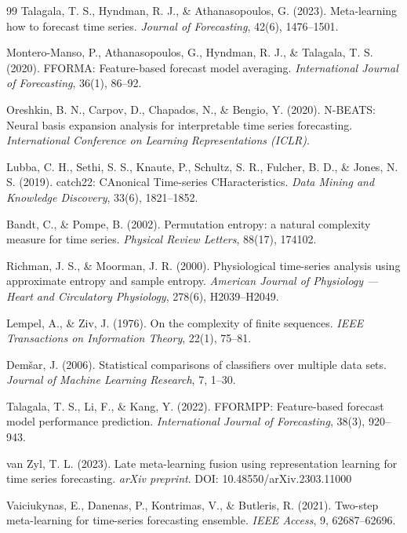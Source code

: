{\begin{thebibliography}{99}
Talagala, T. S., Hyndman, R. J., \& Athanasopoulos, G. (2023). Meta-learning how to
forecast time series. \emph{Journal of Forecasting}, 42(6), 1476--1501.

Montero-Manso, P., Athanasopoulos, G., Hyndman, R. J., \& Talagala, T. S. (2020).
FFORMA: Feature-based forecast model averaging.
\emph{International Journal of Forecasting}, 36(1), 86--92.

Oreshkin, B. N., Carpov, D., Chapados, N., \& Bengio, Y. (2020). N-BEATS: Neural basis
expansion analysis for interpretable time series forecasting.
\emph{International Conference on Learning Representations (ICLR)}.

Lubba, C. H., Sethi, S. S., Knaute, P., Schultz, S. R., Fulcher, B. D., \& Jones, N. S.
(2019). catch22: CAnonical Time-series CHaracteristics.
\emph{Data Mining and Knowledge Discovery}, 33(6), 1821--1852.

Bandt, C., \& Pompe, B. (2002). Permutation entropy: a natural complexity measure
for time series. \emph{Physical Review Letters}, 88(17), 174102.

Richman, J. S., \& Moorman, J. R. (2000). Physiological time-series analysis using
approximate entropy and sample entropy.
\emph{American Journal of Physiology --- Heart and Circulatory Physiology},
278(6), H2039--H2049.

Lempel, A., \& Ziv, J. (1976). On the complexity of finite sequences.
\emph{IEEE Transactions on Information Theory}, 22(1), 75--81.

Dem\v{s}ar, J. (2006). Statistical comparisons of classifiers over multiple data
sets. \emph{Journal of Machine Learning Research}, 7, 1--30.

Talagala, T. S., Li, F., \& Kang, Y. (2022). FFORMPP: Feature-based forecast model
performance prediction.
\emph{International Journal of Forecasting}, 38(3), 920--943.

van Zyl, T. L. (2023). Late meta-learning fusion using representation learning for
time series forecasting. \emph{arXiv preprint}. DOI: 10.48550/arXiv.2303.11000

Vaiciukynas, E., Danenas, P., Kontrimas, V., \& Butleris, R. (2021). Two-step
meta-learning for time-series forecasting ensemble. \emph{IEEE Access}, 9,
62687--62696.


\end{thebibliography}}
